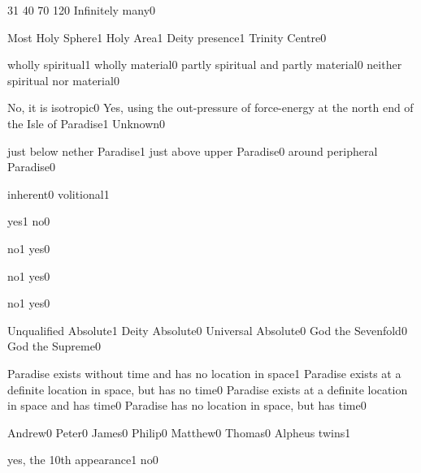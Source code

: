 {3}{1}
{4}{0}
{7}{0}
{12}{0}
{Infinitely many}{0}
\qstop

{Most Holy Sphere}{1}
{Holy Area}{1}
{Deity presence}{1}
{Trinity Centre}{0}
\qstop

{wholly spiritual}{1}
{wholly material}{0}
{partly spiritual and partly material}{0}
{neither spiritual nor material}{0}
\qstop

{No, it is isotropic}{0}
{Yes, using the out-pressure of force-energy at the north end of the Isle of Paradise}{1}
{Unknown}{0}
\qstop

{just below nether Paradise}{1}
{just above upper Paradise}{0}
{around peripheral Paradise}{0}
\qstop

{inherent}{0}
{volitional}{1}
\qstop

{yes}{1}
{no}{0}
\qstop

{no}{1}
{yes}{0}
\qstop

{no}{1}
{yes}{0}
\qstop

{no}{1}
{yes}{0}
\qstop

{Unqualified Absolute}{1}
{Deity Absolute}{0}
{Universal Absolute}{0}
{God the Sevenfold}{0}
{God the Supreme}{0}
\qstop

{Paradise exists without time and has no location in space}{1}
{Paradise exists at a definite location in space, but has no time}{0}
{Paradise exists at a definite location in space and has time}{0}
{Paradise has no location in space, but has time}{0}
\qstop

{Andrew}{0}
{Peter}{0}
{James}{0}
{Philip}{0}
{Matthew}{0}
{Thomas}{0}
{Alpheus twins}{1}
\qstop

{yes, the 10th appearance}{1}
{no}{0}
\qstop


